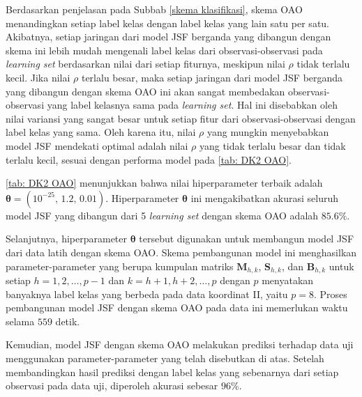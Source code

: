 \noindent Berdasarkan penjelasan pada Subbab \ref{skema klasifikasi}, skema OAO menandingkan setiap label kelas dengan label kelas yang lain satu per satu. Akibatnya, setiap jaringan dari model JSF berganda yang dibangun dengan skema ini lebih mudah mengenali label kelas dari observasi-observasi pada \emph{learning set} berdasarkan nilai dari setiap fiturnya, meskipun nilai $\rho$ tidak terlalu kecil. Jika nilai $\rho$ terlalu besar, maka setiap jaringan dari model JSF berganda yang dibangun dengan skema OAO ini akan sangat membedakan observasi-observasi yang label kelasnya sama pada \emph{learning set}. Hal ini disebabkan oleh nilai variansi yang sangat besar untuk setiap fitur dari observasi-observasi dengan label kelas yang sama.  Oleh karena itu, nilai $\rho$ yang mungkin menyebabkan model JSF mendekati optimal adalah nilai $\rho$ yang tidak terlalu besar dan tidak terlalu kecil, sesuai dengan performa model pada \ref{tab: DK2 OAO}.

\noindent \ref{tab: DK2 OAO} menunjukkan bahwa nilai hiperparameter terbaik adalah $\boldsymbol{\theta} = (10^{-25} \text{, }\allowbreak \num{1,2} \text{, } \allowbreak \num{0,01})$. Hiperparameter $\boldsymbol{\theta}$ ini mengakibatkan akurasi seluruh model JSF yang dibangun dari 5 \emph{learning set} dengan skema OAO adalah $\num{85,6}\%$.

\noindent Selanjutnya, hiperparameter $\boldsymbol{\theta}$ tersebut digunakan untuk membangun model JSF dari data latih dengan skema OAO. Skema pembangunan model ini menghasilkan parameter-parameter yang berupa kumpulan matriks $\mathbf{M}_{h,k}$, $\mathbf{S}_{h,k}$, dan $\mathbf{B}_{h,k}$ untuk setiap $h=1,2, \ldots, p-1$ dan $k = h+1, h+2, \ldots, p$ dengan $p$ menyatakan banyaknya label kelas yang berbeda pada data koordinat II, yaitu $p=8$. Proses pembangunan model JSF dengan skema OAO pada data ini memerlukan waktu selama $559$ detik.

\noindent Kemudian, model JSF dengan skema OAO melakukan prediksi terhadap data uji menggunakan parameter-parameter yang telah disebutkan di atas. Setelah membandingkan hasil prediksi dengan label kelas yang sebenarnya dari setiap observasi pada data uji, diperoleh akurasi sebesar $\num{96}\%$.

